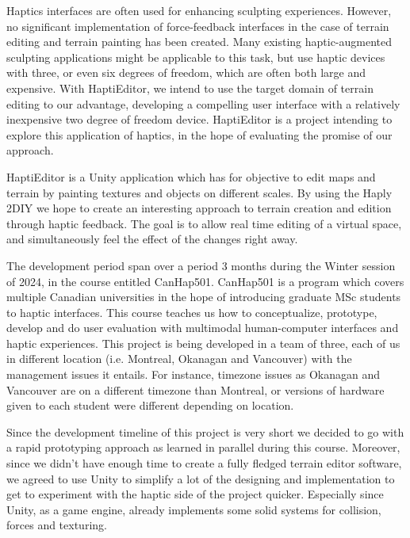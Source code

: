 Haptics interfaces are often used for enhancing sculpting experiences.
However, no significant implementation of force-feedback interfaces in the case of terrain editing and terrain painting has been created.
Many existing haptic-augmented sculpting applications might be applicable to this task, but use haptic devices with three, or even six degrees of freedom, which are often both large and expensive.
With HaptiEditor, we intend to use the target domain of terrain editing to our advantage, developing a compelling user interface with a relatively inexpensive two degree of freedom device.
HaptiEditor is a project intending to explore this application of haptics, in the hope of evaluating the promise of our approach.

HaptiEditor is a Unity application which has for objective to edit maps and terrain by painting textures and objects on different scales. 
By using the Haply 2DIY we hope to create an interesting approach to terrain creation and edition through haptic feedback.
The goal is to allow real time editing of a virtual space, and simultaneously feel the effect of the changes right away.

The development period span over a period 3 months during the Winter session of 2024, in the course entitled CanHap501.
CanHap501 is a program which covers multiple Canadian universities in the hope of introducing graduate MSc students to haptic interfaces. 
This course teaches us how to conceptualize, prototype, develop and do user evaluation with multimodal human-computer interfaces and haptic experiences.
This project is being developed in a team of three, each of us in different location (i.e. Montreal, Okanagan and Vancouver) with the management issues it entails. 
For instance, timezone issues as Okanagan and Vancouver are on a different timezone than Montreal,
or versions of hardware given to each student were different depending on location.

Since the development timeline of this project is very short we decided to go with a rapid prototyping approach as learned in parallel during this course.
Moreover, since we didn't have enough time to create a fully fledged terrain editor software,
we agreed to use Unity to simplify a lot of the designing and implementation to get to experiment with the haptic side of the project quicker.
Especially since Unity, as a game engine, already implements some solid systems for collision, forces and texturing.

